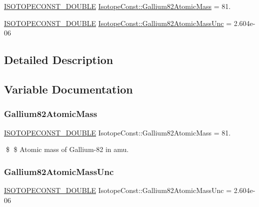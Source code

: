 \begin{DoxyCompactItemize}
\item 
\mbox{\hyperlink{group___isotope_const-_macros_ga8f45a7272ce02c0b4c65c44636ed719a}{I\+S\+O\+T\+O\+P\+E\+C\+O\+N\+S\+T\+\_\+\+D\+O\+U\+B\+LE}} \mbox{\hyperlink{group___isotope_const-_gallium-_ga82_ga545da5fed860e3c882269eef230ff3e0}{Isotope\+Const\+::\+Gallium82\+Atomic\+Mass}} = 81.
\item 
\mbox{\hyperlink{group___isotope_const-_macros_ga8f45a7272ce02c0b4c65c44636ed719a}{I\+S\+O\+T\+O\+P\+E\+C\+O\+N\+S\+T\+\_\+\+D\+O\+U\+B\+LE}} \mbox{\hyperlink{group___isotope_const-_gallium-_ga82_ga198a59643d13977836b4f95f992a32bf}{Isotope\+Const\+::\+Gallium82\+Atomic\+Mass\+Unc}} = 2.\+604e-\/06
\end{DoxyCompactItemize}


\subsection{Detailed Description}


\subsection{Variable Documentation}
\mbox{\label{group___isotope_const-_gallium-_ga82_ga545da5fed860e3c882269eef230ff3e0}} 
\subsubsection{\texorpdfstring{Gallium82\+Atomic\+Mass}{Gallium82AtomicMass}}
{\footnotesize\ttfamily \mbox{\hyperlink{group___isotope_const-_macros_ga8f45a7272ce02c0b4c65c44636ed719a}{I\+S\+O\+T\+O\+P\+E\+C\+O\+N\+S\+T\+\_\+\+D\+O\+U\+B\+LE}} Isotope\+Const\+::\+Gallium82\+Atomic\+Mass = 81.}

\$ \$ Atomic mass of Gallium-\/82 in amu. \mbox{\label{group___isotope_const-_gallium-_ga82_ga198a59643d13977836b4f95f992a32bf}} 
\subsubsection{\texorpdfstring{Gallium82\+Atomic\+Mass\+Unc}{Gallium82AtomicMassUnc}}
{\footnotesize\ttfamily \mbox{\hyperlink{group___isotope_const-_macros_ga8f45a7272ce02c0b4c65c44636ed719a}{I\+S\+O\+T\+O\+P\+E\+C\+O\+N\+S\+T\+\_\+\+D\+O\+U\+B\+LE}} Isotope\+Const\+::\+Gallium82\+Atomic\+Mass\+Unc = 2.\+604e-\/06}

